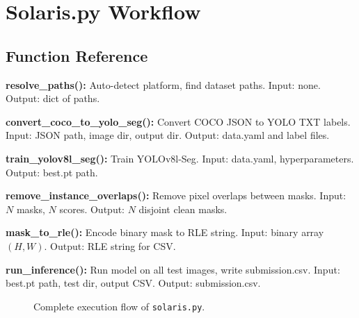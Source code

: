 \documentclass[12pt,a4paper,openany]{report}
\begin{document}
\chapter{Solaris.py Workflow}

\section{Function Reference}

\begin{defbox}
\textbf{resolve\_paths():} Auto-detect platform, find dataset paths.
Input: none. Output: dict of paths.
\end{defbox}

\begin{defbox}
\textbf{convert\_coco\_to\_yolo\_seg():} Convert COCO JSON to YOLO TXT labels.
Input: JSON path, image dir, output dir. Output: data.yaml and label files.
\end{defbox}

\begin{defbox}
\textbf{train\_yolov8l\_seg():} Train YOLOv8l-Seg.
Input: data.yaml, hyperparameters. Output: best.pt path.
\end{defbox}

\begin{defbox}
\textbf{remove\_instance\_overlaps():} Remove pixel overlaps between masks.
Input: $N$ masks, $N$ scores. Output: $N$ disjoint clean masks.
\end{defbox}

\begin{defbox}
\textbf{mask\_to\_rle():} Encode binary mask to RLE string.
Input: binary array $(H,W)$. Output: RLE string for CSV.
\end{defbox}

\begin{defbox}
\textbf{run\_inference():} Run model on all test images, write submission.csv.
Input: best.pt path, test dir, output CSV. Output: submission.csv.
\end{defbox}

\begin{figure}[H]
\centering
{}
\caption{Complete execution flow of \texttt{solaris.py}.}
\label{fig:solaris_flow}
\end{figure}
\end{document}
